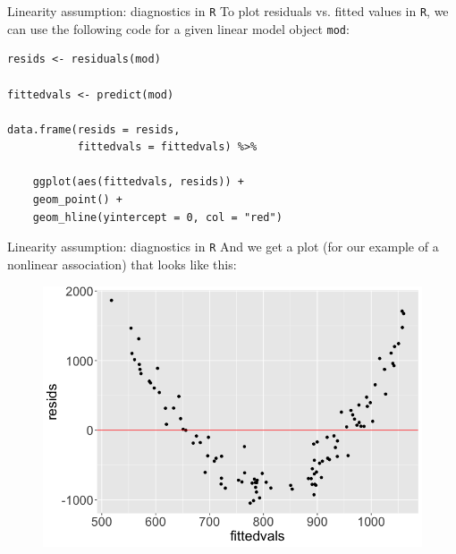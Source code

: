 \documentclass[10pt,t]{beamer}
\begin{document}
\begin{frame}[fragile]{Linearity assumption: diagnostics in \texttt{R}}
To plot residuals vs. fitted values in \texttt{R}, we can use the following code for a given linear model object \texttt{mod}:

\vspace{0.2cm}

\begin{lstlisting}
resids <- residuals(mod)

fittedvals <- predict(mod)

data.frame(resids = resids,
           fittedvals = fittedvals) %>%
      
	ggplot(aes(fittedvals, resids)) +
	geom_point() +
	geom_hline(yintercept = 0, col = "red") 
\end{lstlisting}


\end{frame}

\begin{frame}{Linearity assumption: diagnostics in \texttt{R}}
And we get a plot (for our example of a nonlinear association) that looks like this:
\medskip

\begin{figure}
\centering \includegraphics[scale=0.3]{figures/fitted_resids.png}
\end{figure}

\end{frame}
\end{document}
